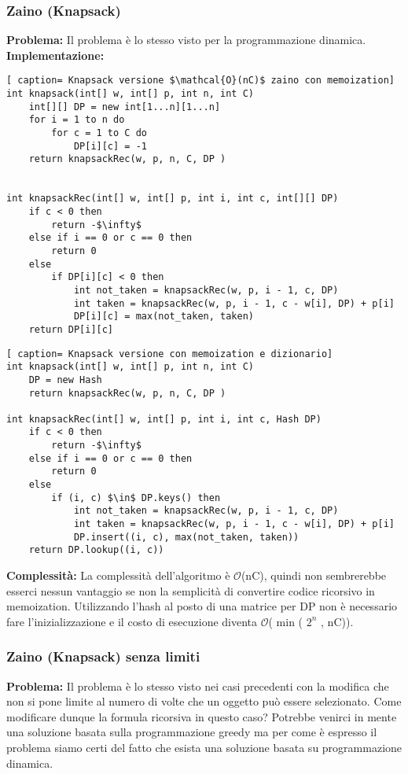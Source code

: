 \documentclass[../cheatSheetAlgoritmi.tex]{subfiles}
\begin{document}
\subsubsection{Zaino (Knapsack)}
\textbf{Problema:} Il problema è lo stesso visto per la programmazione dinamica. \\
\textbf{Implementazione:}
\begin{lstlisting}[ caption= Knapsack versione $\mathcal{O}(nC)$ zaino con memoization]
int knapsack(int[] w, int[] p, int n, int C)
	int[][] DP = new int[1...n][1...n]
	for i = 1 to n do
		for c = 1 to C do
			DP[i][c] = -1
	return knapsackRec(w, p, n, C, DP )
	
	
int knapsackRec(int[] w, int[] p, int i, int c, int[][] DP)
	if c < 0 then
		return -$\infty$
	else if i == 0 or c == 0 then
		return 0
	else 
		if DP[i][c] < 0 then 
			int not_taken = knapsackRec(w, p, i - 1, c, DP)
			int taken = knapsackRec(w, p, i - 1, c - w[i], DP) + p[i]
			DP[i][c] = max(not_taken, taken)
	return DP[i][c]
\end{lstlisting}


\begin{lstlisting}[ caption= Knapsack versione con memoization e dizionario]
int knapsack(int[] w, int[] p, int n, int C)
	DP = new Hash
	return knapsackRec(w, p, n, C, DP )
	
int knapsackRec(int[] w, int[] p, int i, int c, Hash DP)
	if c < 0 then
		return -$\infty$
	else if i == 0 or c == 0 then
		return 0
	else 
		if (i, c) $\in$ DP.keys() then 
			int not_taken = knapsackRec(w, p, i - 1, c, DP)
			int taken = knapsackRec(w, p, i - 1, c - w[i], DP) + p[i]
			DP.insert((i, c), max(not_taken, taken))
	return DP.lookup((i, c))
\end{lstlisting}
\textbf{Complessità:} La complessità dell'algoritmo è $\mathcal{O}$(nC), quindi non sembrerebbe esserci nessun vantaggio se non la semplicità di convertire codice ricorsivo in memoization. Utilizzando l'hash al posto di una matrice per DP non è necessario fare l'inizializzazione e il costo di esecuzione diventa $\mathcal{O}$( min ( $2^{n}$ , nC)).\


\subsubsection{Zaino (Knapsack) senza limiti}
\textbf{Problema:} Il problema è lo stesso visto nei casi precedenti con la modifica che non si pone limite al numero di volte che un oggetto può essere selezionato. Come modificare dunque la formula ricorsiva in questo caso? Potrebbe venirci in mente una soluzione basata sulla programmazione greedy ma per come è espresso il problema siamo certi del fatto che esista una soluzione basata su programmazione dinamica.
\end{document}
